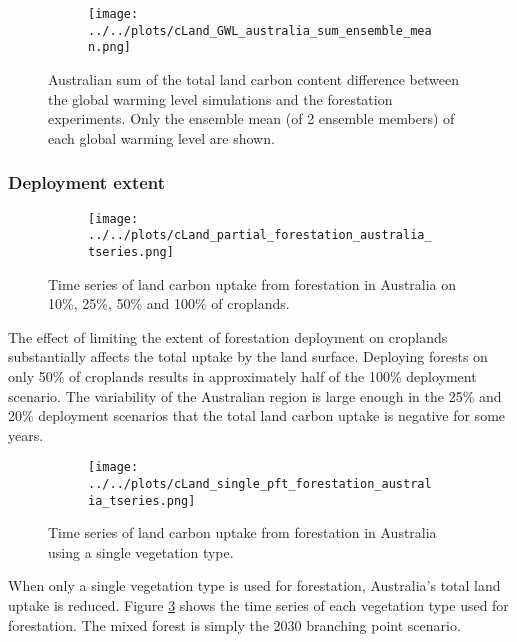 \documentclass[]{article}
\begin{document}
\begin{figure}[H]
    \centering
    \begin{subfigure}[b]{\linewidth}
        \texttt{[image: ../../plots/cLand\_GWL\_australia\_sum\_ensemble\_mean.png]}
    \end{subfigure}
    \caption{Australian sum of the total land carbon content difference between the global warming level simulations and the forestation experiments. Only the ensemble mean (of 2 ensemble members) of each global warming level are shown.}
    \label{fig:australia_cLand}
\end{figure}

\subsubsection{Deployment extent}

\begin{figure}[H]
    \centering
    \begin{subfigure}[b]{\linewidth}
        \texttt{[image: ../../plots/cLand\_partial\_forestation\_australia\_tseries.png]}
    \end{subfigure}
    \caption{Time series of land carbon uptake from forestation in Australia on 10\%, 25\%, 50\% and 100\% of croplands.}
    \label{fig:australia_cLand_tseries}
\end{figure}

The effect of limiting the extent of forestation deployment on croplands substantially affects the total uptake by the land surface.
Deploying forests on only 50\% of croplands results in approximately half of the 100\% deployment scenario.
The variability of the Australian region is large enough in the 25\% and 20\% deployment scenarios that the total land carbon uptake is negative for some years.

\begin{figure}[H]
    \centering
    \begin{subfigure}[b]{\linewidth}
        \texttt{[image: ../../plots/cLand\_single\_pft\_forestation\_australia\_tseries.png]}
    \end{subfigure}
    \caption{Time series of land carbon uptake from forestation in Australia using a single vegetation type.}
    \label{fig:australia_cLand_tseries_veg_type}
\end{figure}

When only a single vegetation type is used for forestation, Australia's total land uptake is reduced.
Figure \ref{fig:australia_cLand_tseries_veg_type} shows the time series of each vegetation type used for forestation.
The mixed forest is simply the 2030 branching point scenario.
\end{document}
